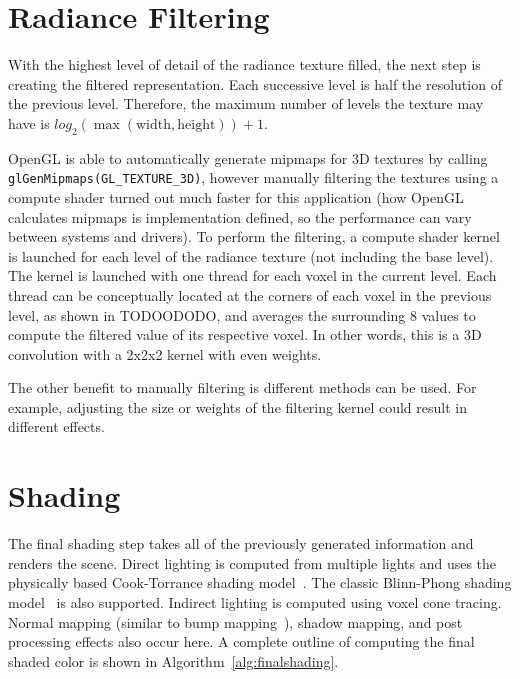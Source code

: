 
\section{Radiance Filtering}
With the highest level of detail of the radiance texture filled, the next step is creating the filtered representation. Each successive level is half the resolution of the previous level. Therefore, the maximum number of levels the texture may have is $log_2 (\max (\text{width}, \text{height})) + 1$.

OpenGL is able to automatically generate mipmaps for 3D textures by calling \verb#glGenMipmaps(GL_TEXTURE_3D)#, however manually filtering the textures using a compute shader turned out much faster for this application (how OpenGL calculates mipmaps is implementation defined, so the performance can vary between systems and drivers). To perform the filtering, a compute shader kernel is launched for each level of the radiance texture (not including the base level). The kernel is launched with one thread for each voxel in the current level. Each thread can be conceptually located at the corners of each voxel in the previous level, as shown in TODOODODO, and averages the surrounding 8 values to compute the filtered value of its respective voxel. In other words, this is a 3D convolution with a 2x2x2 kernel with even weights.

The other benefit to manually filtering is different methods can be used. For example, adjusting the size or weights of the filtering kernel could result in different effects.


\section{Shading}
The final shading step takes all of the previously generated information and renders the scene. Direct lighting is computed from multiple lights and uses the physically based Cook-Torrance shading model~\cite{Cook:1982:RMC:357290.357293}. The classic Blinn-Phong shading model~\cite{Phong:1975:ICG:360825.360839} is also supported. Indirect lighting is computed using voxel cone tracing. Normal mapping (similar to bump mapping~\cite{Blinn:1978:SWS:965139.507101}), shadow mapping, and post processing effects also occur here. A complete outline of computing the final shaded color is shown in Algorithm~\ref{alg:finalshading}.

